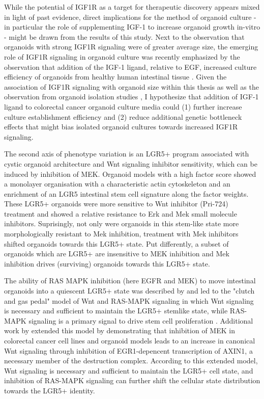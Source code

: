 \begin{flushleft}
While the potential of IGF1R as a target for therapeutic discovery appears mixed in light of past evidence, direct implications for the method of organoid culture - in particular the role of supplementing IGF-1 to increase organoid growth in-vitro - might be drawn from the results of this study. Next to the observation that organoids with strong IGF1R signaling were of greater average size, the emerging role of IGF1R signaling in organoid culture was recently emphasized by the observation that addition of the IGF-1 ligand, relative to EGF, increased culture efficiency of organoids from healthy human intestinal tissue \cite{fujiiHumanIntestinalOrganoids2018a}. Given the association of IGF1R signaling with organoid size within this thesis as well as the observation from organoid isolation studies \cite{fujiiHumanIntestinalOrganoids2018a}, I hypothesize that addition of IGF-1 ligand to colorectal cancer organoid culture media could (1) further increase culture establishment efficiency and (2) reduce additional genetic bottleneck effects that might bias isolated organoid cultures towards increased IGF1R signaling.
\bigbreak

The second axis of phenotype variation is an LGR5+ program associated with cystic organoid architecture and Wnt signaling inhibitor sensitivity, which can be induced by inhibition of MEK. Organoid models with a high factor score showed a monolayer organisation with a characteristic actin cytoskeleton and an enrichment of an LGR5 intestinal stem cell signature along the factor weights. These LGR5+ organoids were more sensitive to Wnt inhibitor (Pri-724) treatment and showed a relative resistance to Erk and Mek small molecule inhibitors. Suprisingly, not only were organoids in this stem-like state more morphologically resistant to Mek inhibition, treatment with Mek inhibitors shifted organoids towards this LGR5+ state. Put differently, a subset of organoids which are LGR5+ are insensitive to MEK inhibition and Mek inhibition drives (surviving) organoids towards this LGR5+ state.
\smallbreak

The ability of RAS MAPK inhibition (here EGFR and MEK) to move intestinal organoids into a quiescent LGR5+ state was described by \cite{basakInducedQuiescenceLgr52017c} and led to the "clutch and gas pedal" model of Wnt and RAS-MAPK signaling in which Wnt signaling is necessary and sufficient to maintain the LGR5+ stemlike state, while RAS-MAPK signaling is a primary signal to drive stem cell proliferation \cite{basakInducedQuiescenceLgr52017c}. Additional work by \cite{zhanMEKInhibitorsActivate2019a} extended this model by demonstrating that inhibition of MEK in colorectal cancer cell lines and organoid models leads to an increase in canonical Wnt signaling through inhibition of EGR1-depencent transcription of AXIN1, a necessary member of the destruction complex. According to this extended model, Wnt signaling is necessary and sufficient to maintain the LGR5+ cell state, and inhibition of RAS-MAPK signaling can further shift the cellular state distribution towards the LGR5+ identity. 
\smallbreak


\end{flushleft}
